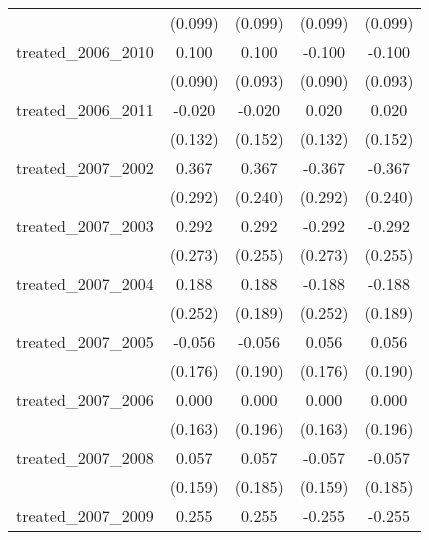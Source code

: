 {\begin{tabular}{l*{4}{c}}
            &     (0.099)         &     (0.099)         &     (0.099)         &     (0.099)         \\
[1em]
treated\_2006\_2010&       0.100         &       0.100         &      -0.100         &      -0.100         \\
            &     (0.090)         &     (0.093)         &     (0.090)         &     (0.093)         \\
[1em]
treated\_2006\_2011&      -0.020         &      -0.020         &       0.020         &       0.020         \\
            &     (0.132)         &     (0.152)         &     (0.132)         &     (0.152)         \\
[1em]
treated\_2007\_2002&       0.367         &       0.367         &      -0.367         &      -0.367         \\
            &     (0.292)         &     (0.240)         &     (0.292)         &     (0.240)         \\
[1em]
treated\_2007\_2003&       0.292         &       0.292         &      -0.292         &      -0.292         \\
            &     (0.273)         &     (0.255)         &     (0.273)         &     (0.255)         \\
[1em]
treated\_2007\_2004&       0.188         &       0.188         &      -0.188         &      -0.188         \\
            &     (0.252)         &     (0.189)         &     (0.252)         &     (0.189)         \\
[1em]
treated\_2007\_2005&      -0.056         &      -0.056         &       0.056         &       0.056         \\
            &     (0.176)         &     (0.190)         &     (0.176)         &     (0.190)         \\
[1em]
treated\_2007\_2006&       0.000         &       0.000         &       0.000         &       0.000         \\
            &     (0.163)         &     (0.196)         &     (0.163)         &     (0.196)         \\
[1em]
treated\_2007\_2008&       0.057         &       0.057         &      -0.057         &      -0.057         \\
            &     (0.159)         &     (0.185)         &     (0.159)         &     (0.185)         \\
[1em]
treated\_2007\_2009&       0.255         &       0.255         &      -0.255         &      -0.255         \\

\end{tabular}}
